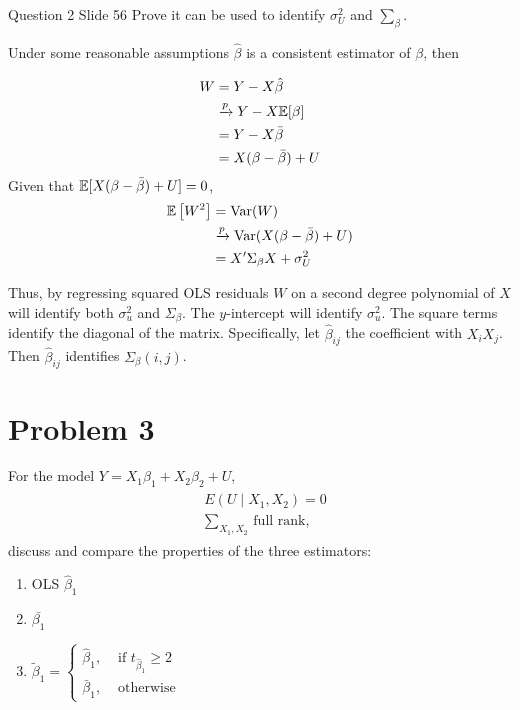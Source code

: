 \documentclass{article}
\begin{document}
\begin{problem}{Question 2 Slide 56}
Prove it can be used to identify $\sigma_{U}^{2}$ and $\sum_{\beta}$.
\end{problem}
\begin{solution}
Under some reasonable assumptions $\hat{\beta}$ is a consistent estimator of $\beta$, then

\begin{align*}
W &=Y-X \hat{\beta} \\  
&\xrightarrow{p} Y-X \mathbb{E}[\beta] \\ 
&=Y-X \bar{\beta} \\
&=X(\beta-\bar{\beta})+U
\end{align*}
Given that $\mathbb{E}[X(\beta-\bar{\beta})+U]=0$,
\begin{equation*}
\begin{aligned}
\mathbb{E}\left[W^{2}\right]&=\operatorname{Var}(W) \\
&\xrightarrow{p}\operatorname{Var}(X(\beta-\bar{\beta})+U)\\
&=X^{\prime} \Sigma_{\beta} X+\sigma_{U}^{2}
\end{aligned}
\end{equation*}

Thus, by regressing squared OLS residuals $W$ on a second degree polynomial of $X$ will identify both $\sigma_u^2$ and $\Sigma_\beta$. The $y$-intercept will identify $\sigma_u^2$. The square terms identify the diagonal of the matrix. Specifically, let $\hat{\beta}_{ij}$ the coefficient with $X_iX_j$. Then $\hat{\beta}_{ij}$ identifies $\Sigma_\beta(i,j)$.  
\end{solution}

\newpage

\section*{Problem 3}
 For the model $Y=X_{1} \beta_{1}+X_{2} \beta_{2}+U$,
\begin{align*}
\begin{aligned}
&E\left(U \mid X_{1}, X_{2}\right)=0 \\
&\sum_{X_{1}, X_{2}} \text { full rank, }
\end{aligned}
\end{align*}
discuss and compare the properties of the three estimators: \\
\begin{enumerate}[label=(\alph*)]
    \item OLS $\hat\beta_1$
    \item $\bar{\beta_1}$
    \item $\tilde{\beta}_1=\begin{cases}
            \hat\beta_{1}, & \text { if } t_{\hat{\beta}_{1}} \geq 2 \\ 
            \bar{\beta}_{1}, & \text{ otherwise}
        \end{cases}$
\end{enumerate}
\end{document}

